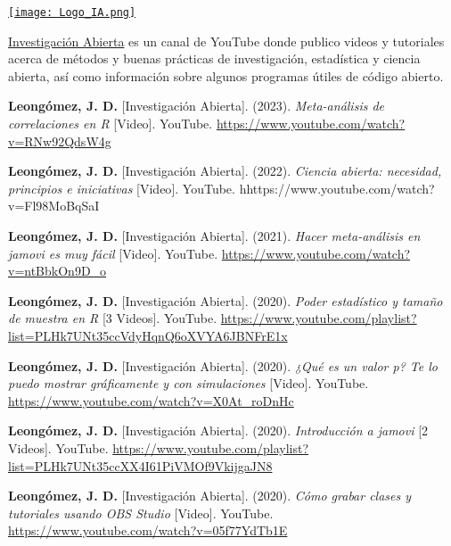 \documentclass[11pt,a4paper,]{awesome-cv}
\begin{document}
\begin{minipage}[c]{0.10\linewidth}
\href{https://www.youtube.com/@InvestigacionAbierta}{\texttt{[image: Logo\_IA.png]}}
\end{minipage} \begin{minipage}[c]{0.90\linewidth} \begin{footnotesize}
\textcolor{red}{\faYoutube} \href{https://www.youtube.com/@InvestigacionAbierta}{Investigación Abierta} es un canal de YouTube donde publico videos y tutoriales acerca de métodos y buenas prácticas de investigación, estadística y ciencia abierta, así como información sobre algunos programas útiles de código abierto.
\end{footnotesize}
\end{minipage}

\begingroup
\footnotesize
\setlength{\parindent}{-0.5in}
\setlength{\leftskip}{0.5in}

\textbf{Leongómez, J. D.} {[}Investigación Abierta{]}. (2023).
\emph{Meta-análisis de correlaciones en R} {[}Video{]}. YouTube.
\url{https://www.youtube.com/watch?v=RNw92QdsW4g}

\textbf{Leongómez, J. D.} {[}Investigación Abierta{]}. (2022).
\emph{Ciencia abierta: necesidad, principios e iniciativas} {[}Video{]}.
YouTube. hhttps://www.youtube.com/watch?v=Fl98MoBqSaI

\textbf{Leongómez, J. D.} {[}Investigación Abierta{]}. (2021).
\emph{Hacer meta-análisis en jamovi es muy fácil} {[}Video{]}. YouTube.
\url{https://www.youtube.com/watch?v=ntBbkOn9D_o}

\textbf{Leongómez, J. D.} {[}Investigación Abierta{]}. (2020).
\emph{Poder estadístico y tamaño de muestra en R} {[}3 Videos{]}.
YouTube.
\url{https://www.youtube.com/playlist?list=PLHk7UNt35ccVdyHqnQ6oXVYA6JBNFrE1x}

\textbf{Leongómez, J. D.} {[}Investigación Abierta{]}. (2020).
\emph{¿Qué es un valor p? Te lo puedo mostrar gráficamente y con
simulaciones} {[}Video{]}. YouTube.
\url{https://www.youtube.com/watch?v=X0At_roDnHc}

\textbf{Leongómez, J. D.} {[}Investigación Abierta{]}. (2020).
\emph{Introducción a jamovi} {[}2 Videos{]}. YouTube.
\url{https://www.youtube.com/playlist?list=PLHk7UNt35ccXX4I61PiVMOf9VkijgaJN8}

\textbf{Leongómez, J. D.} {[}Investigación Abierta{]}. (2020).
\emph{Cómo grabar clases y tutoriales usando OBS Studio} {[}Video{]}.
YouTube. \url{https://www.youtube.com/watch?v=05f77YdTb1E}
\end{document}
